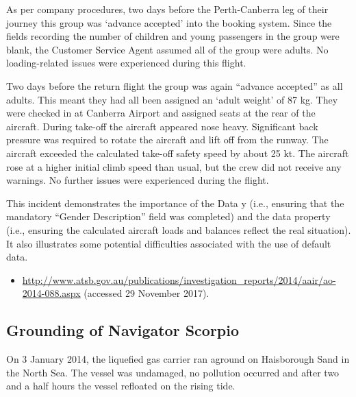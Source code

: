 As per company procedures, two days before the Perth-Canberra leg of their journey this group was `advance accepted' into the booking system. Since the fields recording the number of children and young passengers in the group were blank, the Customer Service Agent assumed all of the group were adults. No loading-related issues were experienced during this flight.

Two days before the return flight the group was again ``advance accepted'' as all adults. This meant they had all been assigned an `adult weight' of 87 kg. They were checked in at Canberra Airport and assigned seats at the rear of the aircraft. During take-off the aircraft appeared nose heavy. Significant back pressure was required to rotate the aircraft and lift off from the runway. The aircraft exceeded the calculated take-off safety speed by about 25 kt. The aircraft rose at a higher initial climb speed than usual, but the crew did not receive any warnings. No further issues were experienced during the flight.

This incident demonstrates the importance of the  Data y (i.e., ensuring that the mandatory ``Gender Description'' field was completed) and the  \gls{data property} (i.e., ensuring the calculated aircraft loads and balances reflect the real situation). It also illustrates some potential difficulties associated with the use of default data.

\begin{samepage}
\begin{itemize}
  \item \raggedright{\href{http://www.atsb.gov.au/publications/investigation_reports/2014/aair/ao-2014-088.aspx}{http://www.atsb.gov.au/publications/investigation\_reports/2014/aair/ao-2014-088.aspx} (accessed 29 November 2017).}
\end{itemize}
\end{samepage}


\subsection{Grounding of Navigator Scorpio} \label{bkm:incacc:navscor}
On 3 January 2014, the liquefied gas carrier  ran aground on Haisborough Sand in the North Sea. The vessel was undamaged, no pollution occurred and after two and a half hours the vessel refloated on the rising tide.

